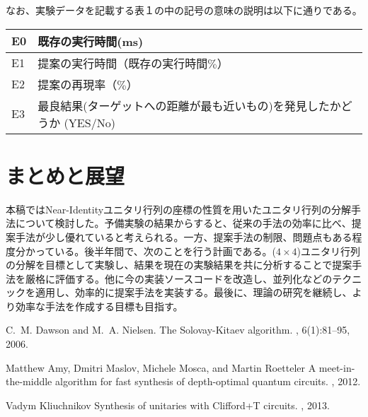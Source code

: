 \documentclass[9pt,a4paper,twocolumn]{jarticle}
\begin{document}
なお、実験データを記載する表１の中の記号の意味の説明は以下に通りである。\\

\begin{tabulary}{\linewidth}{|l|L|}
  \hline
  E0 & 既存の実行時間(ms)  \\ \hline
  E1 & 提案の実行時間（既存の実行時間$\%$）  \\ \hline
  E2 & 提案の再現率（$\%$）  \\ \hline
  E3 & 最良結果(ターゲットへの距離が最も近いもの)を発見したかどうか (YES/No) \\ \hline
\end{tabulary}

\section{まとめと展望}
本稿ではNear-Identityユニタリ行列の座標の性質を用いたユニタリ行列の分解手法について検討した。予備実験の結果からすると、従来の手法の効率に比べ、提案手法が少し優れていると考えられる。一方、提案手法の制限、問題点もある程度分かっている。後半年間で、次のことを行う計画である。($4\times4$)ユニタリ行列の分解を目標として実験し、結果を現在の実験結果を共に分析することで提案手法を厳格に評価する。他に今の実装ソースコードを改造し、並列化などのテクニックを適用し、効率的に提案手法を実装する。最後に、理論の研究を継続し、より効率な手法を作成する目標も目指す。

\begin{thebibliography}{9}

C.~M. Dawson and M.~A. Nielsen.
\newblock The {S}olovay-{K}itaev algorithm.
, 6(1):81--95, 2006.

Matthew Amy, Dmitri Maslov, Michele Mosca, and Martin Roetteler
\newblock A meet-in-the-middle algorithm for fast synthesis of depth-optimal quantum circuits.
, 2012.

Vadym Kliuchnikov
\newblock Synthesis of unitaries with Clifford+T circuits.
, 2013.

\end{thebibliography}
\end{document}

